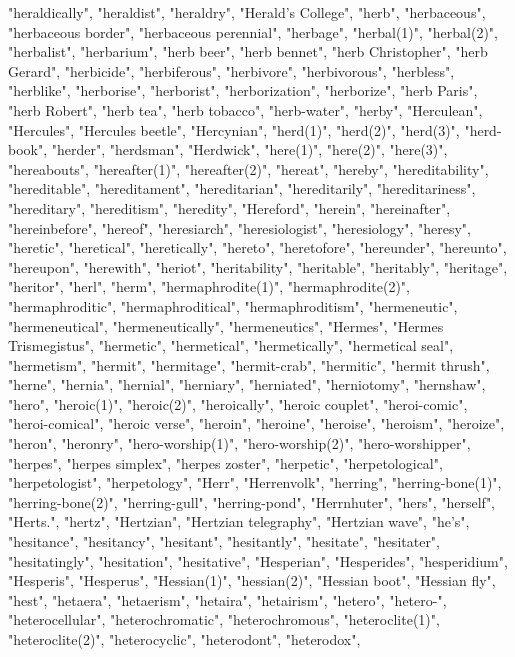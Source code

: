 "heraldically",
"heraldist",
"heraldry",
"Herald's College",
"herb",
"herbaceous",
"herbaceous border",
"herbaceous perennial",
"herbage",
"herbal(1)",
"herbal(2)",
"herbalist",
"herbarium",
"herb beer",
"herb bennet",
"herb Christopher",
"herb Gerard",
"herbicide",
"herbiferous",
"herbivore",
"herbivorous",
"herbless",
"herblike",
"herborise",
"herborist",
"herborization",
"herborize",
"herb Paris",
"herb Robert",
"herb tea",
"herb tobacco",
"herb-water",
"herby",
"Herculean",
"Hercules",
"Hercules beetle",
"Hercynian",
"herd(1)",
"herd(2)",
"herd(3)",
"herd-book",
"herder",
"herdsman",
"Herdwick",
"here(1)",
"here(2)",
"here(3)",
"hereabouts",
"hereafter(1)",
"hereafter(2)",
"hereat",
"hereby",
"hereditability",
"hereditable",
"hereditament",
"hereditarian",
"hereditarily",
"hereditariness",
"hereditary",
"hereditism",
"heredity",
"Hereford",
"herein",
"hereinafter",
"hereinbefore",
"hereof",
"heresiarch",
"heresiologist",
"heresiology",
"heresy",
"heretic",
"heretical",
"heretically",
"hereto",
"heretofore",
"hereunder",
"hereunto",
"hereupon",
"herewith",
"heriot",
"heritability",
"heritable",
"heritably",
"heritage",
"heritor",
"herl",
"herm",
"hermaphrodite(1)",
"hermaphrodite(2)",
"hermaphroditic",
"hermaphroditical",
"hermaphroditism",
"hermeneutic",
"hermeneutical",
"hermeneutically",
"hermeneutics",
"Hermes",
"Hermes Trismegistus",
"hermetic",
"hermetical",
"hermetically",
"hermetical seal",
"hermetism",
"hermit",
"hermitage",
"hermit-crab",
"hermitic",
"hermit thrush",
"herne",
"hernia",
"hernial",
"herniary",
"herniated",
"herniotomy",
"hernshaw",
"hero",
"heroic(1)",
"heroic(2)",
"heroically",
"heroic couplet",
"heroi-comic",
"heroi-comical",
"heroic verse",
"heroin",
"heroine",
"heroise",
"heroism",
"heroize",
"heron",
"heronry",
"hero-worship(1)",
"hero-worship(2)",
"hero-worshipper",
"herpes",
"herpes simplex",
"herpes zoster",
"herpetic",
"herpetological",
"herpetologist",
"herpetology",
"Herr",
"Herrenvolk",
"herring",
"herring-bone(1)",
"herring-bone(2)",
"herring-gull",
"herring-pond",
"Herrnhuter",
"hers",
"herself",
"Herts.",
"hertz",
"Hertzian",
"Hertzian telegraphy",
"Hertzian wave",
"he's",
"hesitance",
"hesitancy",
"hesitant",
"hesitantly",
"hesitate",
"hesitater",
"hesitatingly",
"hesitation",
"hesitative",
"Hesperian",
"Hesperides",
"hesperidium",
"Hesperis",
"Hesperus",
"Hessian(1)",
"hessian(2)",
"Hessian boot",
"Hessian fly",
"hest",
"hetaera",
"hetaerism",
"hetaira",
"hetairism",
"hetero",
"hetero-",
"heterocellular",
"heterochromatic",
"heterochromous",
"heteroclite(1)",
"heteroclite(2)",
"heterocyclic",
"heterodont",
"heterodox",
